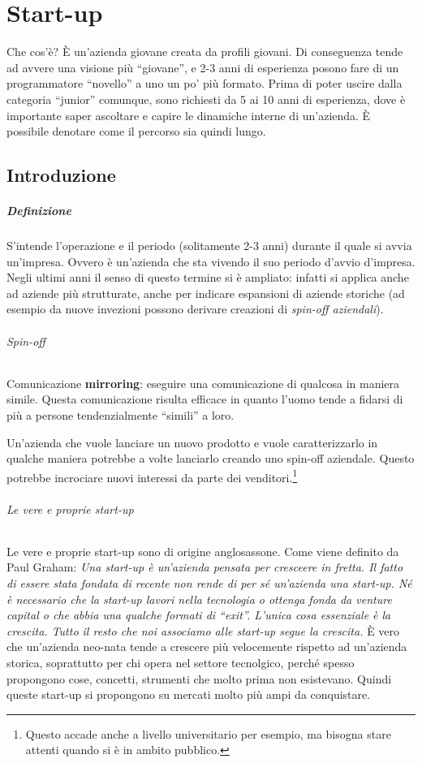 \chapter{Start-up}

Che cos'è? È un'azienda giovane creata da profili giovani. Di conseguenza tende
ad avvere una visione più ``giovane'', e 2-3 anni di esperienza posono fare di
un programmatore ``novello'' a uno un po' più formato.
Prima di poter uscire dalla categoria ``junior'' comunque, sono richiesti da 5
ai 10 anni di esperienza, dove è importante saper ascoltare e capire le
dinamiche interne di un'azienda. È possibile denotare come il percorso sia
quindi lungo.

\section{Introduzione}

\paragraph*{Definizione} S'intende l'operazione e il periodo (solitamente 2-3
anni) durante il quale si avvia un'impresa. Ovvero è un'azienda che sta vivendo
il suo periodo d'avvio d'impresa. Negli ultimi anni il senso di questo termine
si è ampliato: infatti si applica anche ad aziende più strutturate, anche per
indicare espansioni di aziende storiche (ad esempio da nuove invezioni possono
derivare creazioni di \textit{spin-off aziendali}).

\subparagraph*{Spin-off} 

Comunicazione \textbf{mirroring}: eseguire una comunicazione di qualcosa in
maniera simile. Questa comunicazione risulta efficace in quanto l'uomo tende a
fidarsi di più a persone tendenzialmente ``simili'' a loro.

Un'azienda che vuole lanciare un nuovo prodotto e vuole caratterizzarlo in
qualche maniera potrebbe a volte lanciarlo creando uno spin-off aziendale.
Questo potrebbe incrociare nuovi interessi da parte dei
venditori.\footnote{Questo accade anche a livello universitario per esempio, ma
bisogna stare attenti quando si è in ambito pubblico.}

\subparagraph*{Le vere e proprie start-up} Le vere e proprie start-up sono di
origine anglosassone. Come viene definito da Paul Graham:
\emph{
Una start-up è un'azienda pensata per cresceere in fretta. Il fatto di essere
stata fondata di recente non rende di per sé un'azienda una start-up. Né è
necessario che la start-up lavori nella tecnologia o ottenga fonda da venture
capital o che abbia una qualche formati di ``exit''. L'unica cosa essenziale è
la crescita. Tutto il resto che noi associamo alle start-up segue la crescita.
}
È vero che un'azienda neo-nata tende a crescere più velocemente rispetto ad
un'azienda storica, soprattutto per chi opera nel settore tecnolgico, perché
spesso propongono cose, concetti, strumenti che molto prima non esistevano.
Quindi queste start-up si propongono su mercati molto più ampi da conquistare.

